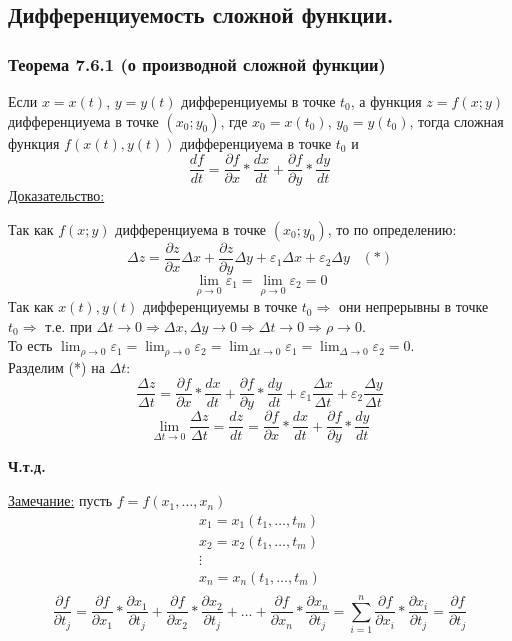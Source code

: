 \documentclass[12pt]{article}
\begin{document}
    \subsection{Дифференциуемость сложной функции.}
    \subsubsection*{Теорема 7.6.1 (о производной сложной функции)}\label{th:7.6.1}
    Если $x = x(t)$, $y = y(t)$ дифференциуемы в точке $t_0$, а функция $z = f(x;y)$ дифференциуема в точке $(x_0; y_0)$, где $x_0 = x(t_0)$, $y_0 = y(t_0)$, тогда сложная функция $f(x(t), y(t))$ дифференциуема в точке $t_0$ и 
    \[ \frac{df}{dt} = \frac{\partial f}{\partial x} * \frac{dx}{dt} + \frac{\partial f}{\partial y} * \frac{dy}{dt} \]
    \underline{Доказательство:}
    \begin{adjustwidth}{1.5em}{1.5em}
        Так как $f(x;y)$ дифференциуема в точке $(x_0; y_0)$, то по определению:
        \[ \Delta z = \frac{\partial z}{\partial x} \Delta x + \frac{\partial z}{\partial y} \Delta y + \varepsilon_1 \Delta x + \varepsilon_2 \Delta y \,\,\,\,\, (*) \]
        \[ \lim_{\rho \to 0} \varepsilon_1 = \lim_{\rho \to 0} \varepsilon_2 = 0 \]
        Так как $x(t), y(t)$ дифференциуемы в точке $t_0 \Rightarrow$ они непрерывны в точке $t_0 \Rightarrow$ т.е. при $\Delta t \to 0 \Rightarrow \Delta x, \Delta y \to 0 \Rightarrow \Delta t \to 0 \Rightarrow \rho \to 0$.\\
        То есть $\lim_{\rho \to 0} \varepsilon_1 = \lim_{\rho \to 0}\varepsilon_2 = \lim_{\Delta t \to 0} \varepsilon_1 = \lim_{\Delta \to 0}\varepsilon_2 = 0$.\\
        Разделим (*) на $\Delta t$:
        \[ \frac{\Delta z}{\Delta t} = \frac{\partial f}{\partial x} * \frac{dx}{dt} + \frac{\partial f}{\partial y} * \frac{dy}{dt} + \varepsilon_1 \frac{\Delta x}{\Delta t} + \varepsilon_2 \frac{\Delta y}{\Delta t} \]
        \[ \lim_{\Delta t \to 0} \frac{\Delta z}{\Delta t} = \frac{dz}{dt} = \frac{\partial f}{\partial x} * \frac{dx}{dt} + \frac{\partial f}{\partial y} * \frac{dy}{dt} \]
        \begin{center}
            \textbf{Ч.т.д.}
        \end{center}
    \end{adjustwidth}
    \underline{Замечание:} пусть $f = f(x_1, \dots, x_n)$
    \begin{gather*}
        x_1 = x_1(t_1, \dots, t_m)\\
        x_2 = x_2(t_1, \dots, t_m)\\
        \vdots\\
        x_n = x_n(t_1, \dots, t_m)\\
    \end{gather*}
    \[ \frac{\partial f}{\partial t_j} = \frac{\partial f}{\partial x_1} * \frac{\partial x_1}{\partial t_j} + \frac{\partial f}{\partial x_2} * \frac{\partial x_2}{\partial t_j} + \dots + \frac{\partial f}{\partial x_n} * \frac{\partial x_n}{\partial t_j} = \sum_{i=1}^{n} \frac{\partial f}{\partial x_i} * \frac{\partial x_i}{\partial t_j} = \frac{\partial f}{\partial t_j} \]
\end{document}
